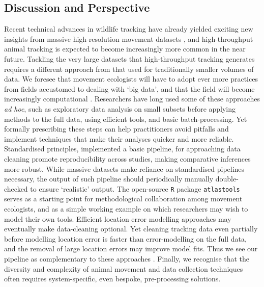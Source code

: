 \begin{refsection}
    \section{Discussion and Perspective}

    Recent technical advances in wildlife tracking have already yielded exciting new insights from massive high-resolution movement datasets \citep{aspillaga2021, aspillaga2021a, baktoft2017, baktoft2019, harel2016, harel2018, oudman2018, papageorgiou2019, tsoar2011, strandburg-peshkin2015, toledo2020, beardsworth2021a, beardsworth2021b, corl2020, vilk2021, lourie2021}, and high-throughput animal tracking is expected to become increasingly more common in the near future.
    Tackling the very large datasets that high-throughput tracking generates requires a different approach from that used for traditionally smaller volumes of data.
    We foresee that movement ecologists will have to adopt ever more practices from fields accustomed to dealing with `big data', and that the field will become increasingly computational \citep{peng2011}.
    Researchers have long used some of these approaches \textit{ad hoc}, such as exploratory data analysis on small subsets before applying methods to the full data, using efficient tools, and basic batch-processing. 
    Yet formally prescribing these steps can help practitioners avoid pitfalls and implement techniques that make their analyses quicker and more reliable.
    Standardised principles, implemented a basic pipeline, for approaching data cleaning promote reproducibility across studies, making comparative inferences more robust.
    While massive datasets make reliance on standardised pipelines necessary, the output of such pipeline should periodically manually double-checked to ensure `realistic' output.
    The open-source \texttt{R} package \texttt{atlastools} serves as a starting point for methodological collaboration among movement ecologists, and as a simple working example on which researchers may wish to model their own tools.
    Efficient location error modelling approaches \citep{fleming2020, aspillaga2021} may eventually make data-cleaning optional.
    Yet cleaning tracking data even partially before modelling location error is faster than error-modelling on the full data, and the removal of large location errors may improve model fits.
    Thus we see our pipeline as complementary to these approaches \citep{fleming2014a, fleming2020}.
    Finally, we recognise that the diversity and complexity of animal movement and data collection techniques often requires system-specific, even bespoke, pre-processing solutions.

\end{refsection}
